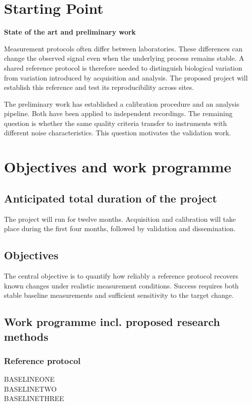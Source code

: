 \documentclass[english,53.01]{proposal}
\begin{document}
\section{Starting Point}
\textbf{State of the art and preliminary work}\par

Measurement protocols often differ between laboratories. These differences can
change the observed signal even when the underlying process remains stable.
A shared reference protocol is therefore needed to distinguish biological
variation from variation introduced by acquisition and analysis. The proposed
project will establish this reference and test its reproducibility across sites.

The preliminary work has established a calibration procedure and an analysis
pipeline. Both have been applied to independent recordings. The remaining
question is whether the same quality criteria transfer to instruments with
different noise characteristics. This question motivates the validation work.

\section{Objectives and work programme}
\subsection{Anticipated total duration of the project}
The project will run for twelve months. Acquisition and calibration will take
place during the first four months, followed by validation and dissemination.

\subsection{Objectives}
The central objective is to quantify how reliably a reference protocol recovers
known changes under realistic measurement conditions. Success requires both
stable baseline measurements and sufficient sensitivity to the target change.

\subsection{Work programme incl. proposed research methods}
\subsubsection{Reference protocol}
BASELINEONE \\ BASELINETWO \\ BASELINETHREE\par
\end{document}
